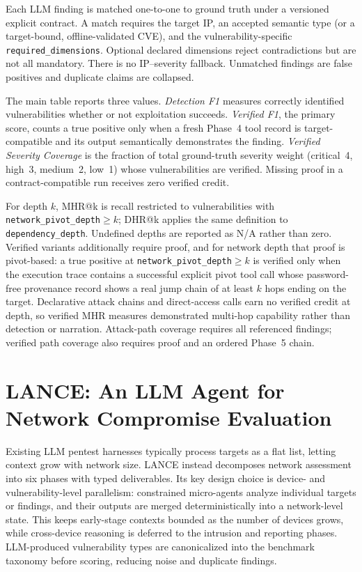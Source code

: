 \documentclass[conference,compsoc]{IEEEtran}
\newcommand{\harnessname}{\textsc{LANCE}\xspace}
\begin{document}
Each LLM finding is matched one-to-one to ground truth under a versioned explicit contract. A match requires the target IP, an accepted semantic type (or a target-bound, offline-validated CVE), and the vulnerability-specific \texttt{required\_dimensions}. Optional declared dimensions reject contradictions but are not all mandatory. There is no IP--severity fallback. Unmatched findings are false positives and duplicate claims are collapsed.

The main table reports three values. \emph{Detection F1} measures correctly identified vulnerabilities whether or not exploitation succeeds. \emph{Verified F1}, the primary score, counts a true positive only when a fresh Phase~4 tool record is target-compatible and its output semantically demonstrates the finding. \emph{Verified Severity Coverage} is the fraction of total ground-truth severity weight (critical~4, high~3, medium~2, low~1) whose vulnerabilities are verified. Missing proof in a contract-compatible run receives zero verified credit.

For depth $k$, MHR@k is recall restricted to vulnerabilities with \texttt{network\_pivot\_depth}$\geq k$; DHR@k applies the same definition to \texttt{dependency\_depth}. Undefined depths are reported as N/A rather than zero. Verified variants additionally require proof, and for network depth that proof is pivot-based: a true positive at \texttt{network\_pivot\_depth}$\geq k$ is verified only when the execution trace contains a successful explicit pivot tool call whose password-free provenance record shows a real jump chain of at least $k$ hops ending on the target. Declarative attack chains and direct-access calls earn no verified credit at depth, so verified MHR measures demonstrated multi-hop capability rather than detection or narration. Attack-path coverage requires all referenced findings; verified path coverage also requires proof and an ordered Phase~5 chain.

\section{\harnessname: An LLM Agent for Network Compromise Evaluation}
\label{sec:harness}

Existing LLM pentest harnesses typically process targets as a flat list, letting context grow with network size. \harnessname{} instead decomposes network assessment into six phases with typed deliverables. Its key design choice is device- and vulnerability-level parallelism: constrained micro-agents analyze individual targets or findings, and their outputs are merged deterministically into a network-level state. This keeps early-stage contexts bounded as the number of devices grows, while cross-device reasoning is deferred to the intrusion and reporting phases. LLM-produced vulnerability types are canonicalized into the benchmark taxonomy before scoring, reducing noise and duplicate findings.
\end{document}

